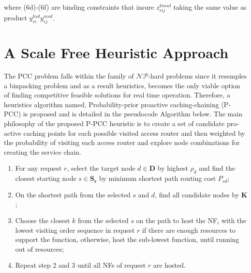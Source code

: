 \documentclass[journal]{IEEEtran}
\begin{document}
where (6d)-(6f) are binding constraints that insure $z_{rij}^{kmsd}$ taking the same value as product $y_{ri}^{ksd}y_{rj}^{msd}$.

\section{A Scale Free Heuristic Approach}
The PCC problem falls within the family of $\mathcal{NP}$-hard problems since it resemples a binpacking problem and as a result heuristics, becomes the only viable option of finding competitive feasible solutions for real time operation. Therefore, a heuristics algorithm named, Probability-prior proactive caching-chaining (P-PCC) is proposed and is detailed in the pseudocode Algorithm \uppercase\expandafter{} below. The main philosophy of the proposed P-PCC heuristic is to create a set of candidate pro-active caching points for each possible visited access router and then weighted by the probability of visiting each access router and explore node combinations for creating the service chain.

\begin{enumerate}%
\item For any request $r$, select the target node $d\in\mathbf{D}$ by highest $\rho_{d}$
  and find the closest starting node $s\in \mathbf{S_{r}}$ by minimum shortest path routing cost $P_{sd}$;
\item On the shortest path from the selected $s$ and $d$, find all candidate nodes by $\mathbf{K}$;
\item Choose the closest $k$ from the selected $s$ on the path to host the NF$_{i}$ with the lowest visiting order sequence in request $r$ if there are enough resources to support the function, otherwise, host the sub-lowest function, until running out of resources;
\item Repeat step 2 and 3 until all NFs of request $r$ are hosted.
\end{enumerate}
\end{document}
